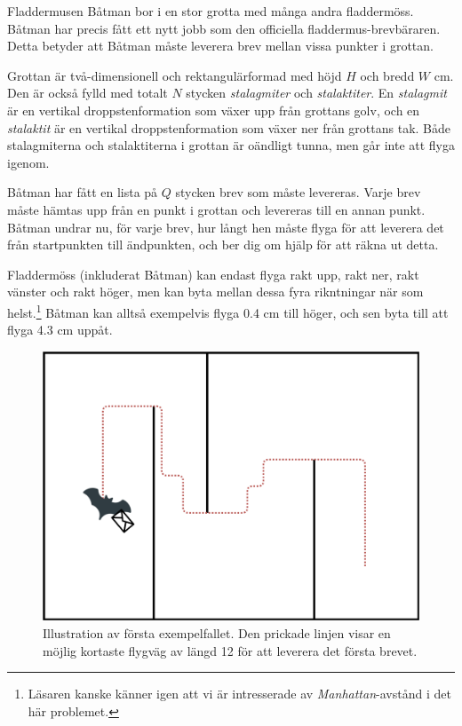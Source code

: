
Fladdermusen Båtman bor i en stor grotta med många andra fladdermöss.
Båtman har precis fått ett nytt jobb som den officiella fladdermus-brevbäraren.
Detta betyder att Båtman måste leverera brev mellan vissa punkter i grottan.

Grottan är två-dimensionell och rektangulärformad med höjd $H$ och bredd $W$ cm.
Den är också fylld med totalt $N$ stycken \emph{stalagmiter} och
\emph{stalaktiter}.  En \emph{stalagmit} är en vertikal droppstenformation som
växer upp från grottans golv, och en \emph{stalaktit} är en vertikal
droppstenformation som växer ner från grottans tak.
Både stalagmiterna och stalaktiterna i grottan är oändligt tunna, men går inte
att flyga igenom.

Båtman har fått en lista på $Q$ stycken brev som måste levereras.
Varje brev måste hämtas upp från en punkt i grottan och levereras till en
annan punkt. Båtman undrar nu, för varje brev, hur långt hen måste flyga
för att leverera det från startpunkten till ändpunkten, och ber dig om
hjälp för att räkna ut detta.

Fladdermöss (inkluderat Båtman) kan endast flyga rakt upp, rakt ner,
rakt vänster och rakt höger, men kan byta mellan dessa fyra rikntningar
när som helst.\footnote{Läsaren kanske känner igen att vi är intresserade av \emph{Manhattan}-avstånd i det här problemet.}
Båtman kan alltså exempelvis flyga 0.4 cm till höger, och sen byta till att flyga
4.3 cm uppåt.

\begin{figure}[!h]
\begin{center}
  \includegraphics[width=12cm]{fladdermus.png}
\end{center}
  \caption{Illustration av första exempelfallet. Den prickade linjen visar
  en möjlig kortaste flygväg av längd 12 för att leverera det första brevet.}
\end{figure}

